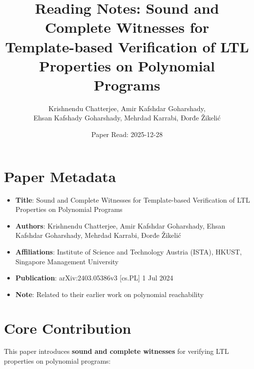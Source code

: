 \documentclass{article}
\title{Reading Notes: Sound and Complete Witnesses for\\
Template-based Verification of LTL Properties on Polynomial Programs}
\author{Krishnendu Chatterjee, Amir Kafshdar Goharshady,\\
Ehsan Kafshady Goharshady, Mehrdad Karrabi, Đorđe Žikelić}
\date{Paper Read: 2025-12-28}
\begin{document}
\maketitle

\section{Paper Metadata}

\begin{itemize}
    \item \textbf{Title}: Sound and Complete Witnesses for Template-based Verification of LTL Properties on Polynomial Programs
    \item \textbf{Authors}: Krishnendu Chatterjee, Amir Kafshdar Goharshady, Ehsan Kafshdar Goharshady, Mehrdad Karrabi, Đorđe Žikelić
    \item \textbf{Affiliations}: Institute of Science and Technology Austria (ISTA), HKUST, Singapore Management University
    \item \textbf{Publication}: arXiv:2403.05386v3 [cs.PL] 1 Jul 2024
    \item \textbf{Note}: Related to their earlier work on polynomial reachability
\end{itemize}

\section{Core Contribution}

This paper introduces \textbf{sound and complete witnesses} for verifying LTL properties on polynomial programs:
\end{document}
